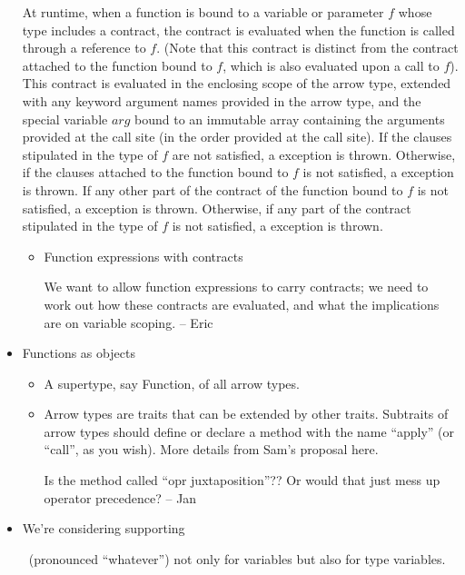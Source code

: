 \begin{itemize}
At runtime, when a function is bound to a variable or parameter
$f$ whose type includes a contract,
the contract is evaluated when the function is called through a reference to $f$.
(Note that this contract is distinct from the contract attached to the function
bound to $f$, which is also evaluated upon a call to $f$).
This contract is evaluated in the enclosing scope of the arrow type,
extended with any keyword argument names provided in the arrow type,
and the special variable $arg$
bound to an immutable array containing the arguments provided at the call site
(in the order provided at the call site).
If the  clauses stipulated in the type of $f$ are not satisfied,
a  exception is thrown.
Otherwise, if the  clauses attached to the function bound to $f$ is not satisfied,
a  exception is thrown.
If any other part of the contract of the function bound to $f$ is not satisfied,
a  exception is thrown.
Otherwise, if any part of the contract stipulated in the type of $f$ is not satisfied,
a  exception is thrown.

  \begin{itemize}
\item Function expressions with contracts

We want to allow function expressions to carry contracts; we need to work
out how these contracts are evaluated, and what the implications are on
variable scoping. -- Eric
  \end{itemize}

\item Functions as objects
  \begin{itemize}
  \item A supertype, say Function, of all arrow types.

  \item Arrow types are traits that can be extended by other traits.
    Subtraits of arrow types should define or declare a method with the
    name ``apply'' (or ``call'', as you wish).  More details from Sam's
    proposal here.

Is the method called ``opr juxtaposition''??  Or would that just mess  up
operator precedence?
-- Jan

  \end{itemize}

\item \ignore

We're considering supporting \ignore\ (pronounced ``whatever'') not only for
variables but also for type variables.


\end{itemize}
